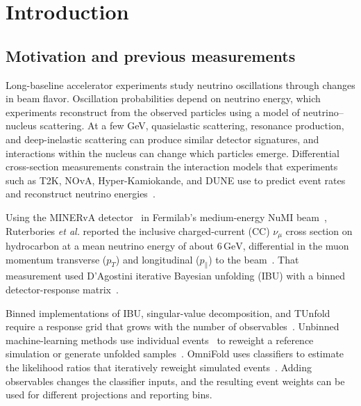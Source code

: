 \section{Introduction}
\label{sec:part-intro}
\label{sec:intro}

\subsection{Motivation and previous measurements}

Long-baseline accelerator experiments study neutrino oscillations through changes in beam flavor. Oscillation probabilities depend on neutrino energy, which experiments reconstruct from the observed particles using a model of neutrino--nucleus scattering. At a few GeV, quasielastic scattering, resonance production, and deep-inelastic scattering can produce similar detector signatures, and interactions within the nucleus can change which particles emerge. Differential cross-section measurements constrain the interaction models that experiments such as T2K, NOvA, Hyper-Kamiokande, and DUNE use to predict event rates and reconstruct neutrino energies~\cite{T2K:2023osc,NOvA:2021nfi,HyperK:2018design,DUNE:2020jqi}.

Using the MINERvA detector~\cite{MINERvA:2013zvz} in Fermilab's medium-energy NuMI beam~\cite{MINERvA:2016iqn}, Ruterbories \emph{et al.} reported the inclusive charged-current (CC) $\nu_\mu$ cross section on hydrocarbon at a mean neutrino energy of about $6\,\mathrm{GeV}$, differential in the muon momentum transverse ($p_T$) and longitudinal ($p_\parallel$) to the beam~\cite{MINERvA:2021owq}. That measurement used D'Agostini iterative Bayesian unfolding (IBU) with a binned detector-response matrix~\cite{DAgostini:1994fjx}.

Binned implementations of IBU, singular-value decomposition, and TUnfold require a response grid that grows with the number of observables~\cite{Adye:2011gm,Hocker:1995kb,Schmitt:2012kp}. Unbinned machine-learning methods use individual events~\cite{Arratia:2021otl,Huetsch:2024quz,Canelli:2025guide} to reweight a reference simulation or generate unfolded samples~\cite{Datta:2018mwd,Bellagente:2019uyp,Bellagente:2020piv,Backes:2022vmn}. OmniFold uses classifiers to estimate the likelihood ratios that iteratively reweight simulated events~\cite{Andreassen:2019cjw,Andreassen:2021zzk}. Adding observables changes the classifier inputs, and the resulting event weights can be used for different projections and reporting bins.

